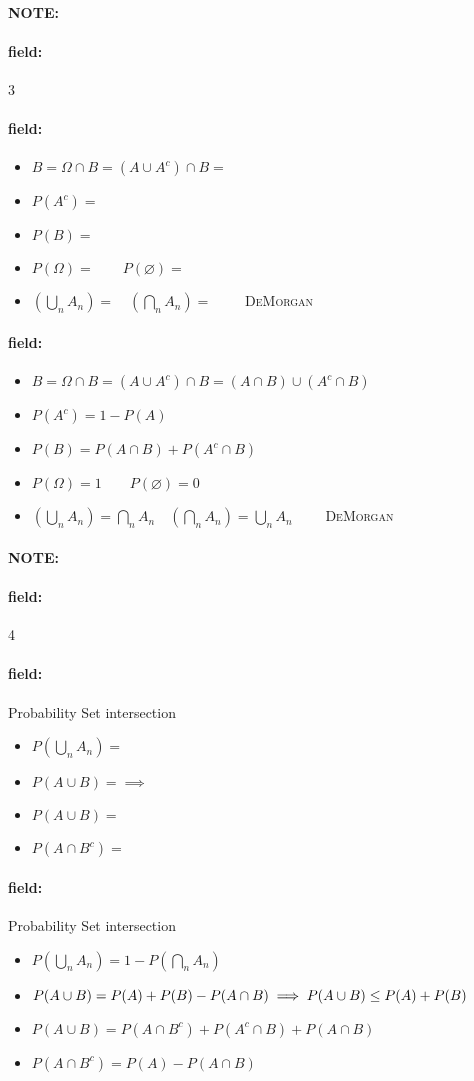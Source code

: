 \documentclass[12pt]{article}
\newenvironment{note}{\paragraph{NOTE:}}{}
\newenvironment{field}{\paragraph{field:}}{}
\begin{document}
\begin{note}
  \begin{field}
    \tiny 3
  \end{field}
  \begin{field}
    \begin{itemize}
  \item $B = \Omega \cap B = (A \cup A^c) \cap B
    = $
  \item $P(A^c) = $
  \item $P(B) = $
  \item $P(\Omega) =  \qquad P(\varnothing) = $
  \item $\left(\bigcup_n A_n\right) =
    \quad
    \left(\bigcap_n A_n\right) =
    \qquad$
    \textsc{DeMorgan}
\end{itemize}
  \end{field}
  \begin{field}
    \begin{itemize}
  \item $B = \Omega \cap B = (A \cup A^c) \cap B
    = (A \cap B) \cup (A^c \cap B)$
  \item $P(A^c) = 1 - P(A)$
  \item $P(B) = P(A \cap B) + P(A^c \cap B)$
  \item $P(\Omega) = 1 \qquad P(\varnothing) = 0$
  \item $\left(\bigcup_n A_n\right) = \bigcap_n A_n
    \quad
    \left(\bigcap_n A_n\right) = \bigcup_n A_n
    \qquad$
    \textsc{DeMorgan}
\end{itemize}
  \end{field}
\end{note}




\begin{note}
  \begin{field}
    \tiny 4
  \end{field}
  \begin{field}
    Probability Set intersection
    \begin{itemize}
      \item $P(\bigcup_n A_n) = $
      \item $P(A \cup B) =
        \implies $
      \item $P(A \cup B)
        = $
      \item $P(A \cap B^c) = $
    \end{itemize}
  \end{field}
  \begin{field}
    Probability Set intersection
    \begin{itemize}
      \item $P(\bigcup_n A_n)
        = 1 - P(\bigcap_n A_n)$
      \item $P(A \cup B) = P(A) + P(B) - P(A \cap B)\\[1ex]
        \implies P(A \cup B) \leq P(A) + P(B)$
      \item $P(A \cup B)
        = P(A \cap B^c) + P(A^c \cap B) + P(A \cap B)$
      \item $P(A \cap B^c) = P(A) - P(A \cap B)$
    \end{itemize}
  \end{field}
\end{note}
\end{document}
